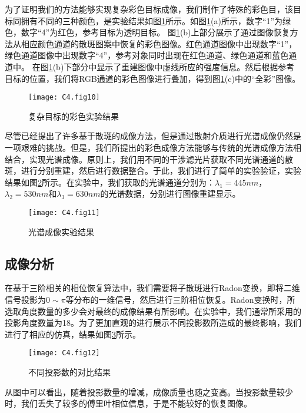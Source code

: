 为了证明我们的方法能够实现复杂彩色目标成像，我们制作了特殊的彩色目，该目标同拥有不同的三种颜色，是实验结果如图\ref{fig:4.10}所示。如图\ref{fig:4.10}(a)所示，数字“1”为绿色，数字“4”为红色，参考目标为透明目标。 图\ref{fig:4.10}(b)上部分展示了通过图像恢复方法从相应颜色通道的散斑图案中恢复的彩色图像。红色通道图像中出现数字“1”，绿色通道图像中出现数字“4”，参考对象同时出现在红色通道、绿色通道和蓝色通道中。 在图\ref{fig:4.10}(b)下部分中显示了重建图像中虚线所应的强度信息。然后根据参考目标的位置，我们将RGB通道的彩色图像进行叠加，得到图\ref{fig:4.10}(c)中的“全彩”图像。

\begin{figure}[htp]
	\centering
	\texttt{[image: C4.fig10]}
	\caption{复杂目标的彩色实验结果}
	\label{fig:4.10}
\end{figure}

尽管已经提出了许多基于散斑的成像方法，但是通过散射介质进行光谱成像仍然是一项艰难的挑战。但是，我们所提出的彩色成像方法能够与传统的光谱成像方法相结合，实现光谱成像。原则上，我们用不同的干涉滤光片获取不同光谱通道的散斑，进行分别重建，然后进行数据整合。于此，我们进行了简单的实验验证，实验结果如图\ref{fig:4.11}所示。在实验中，我们获取的光谱通道分别为：$\lambda_1 =445nm$，$\lambda_2  =530nm$和$\lambda_3  =630nm$的光谱数据，分别进行图像重建显示。

\begin{figure}[htp]
	\centering
	\texttt{[image: C4.fig11]}
	\caption{光谱成像实验结果}
	\label{fig:4.11}
\end{figure}

\subsection{成像分析}

在基于三阶相关的相位恢复算法中，我们需要将子散斑进行Radon变换，即将二维信号投影为$0\sim \pi$等分布的一维信号，然后进行三阶相位恢复。Radon变换时，所选取角度数量的多少会对最终的成像结果有所影响。在实验中，我们通常所采用的投影角度数量为18。为了更加直观的进行展示不同投影数所造成的最终影响，我们进行了相应的仿真，结果如图\ref{fig:4.12}所示。

\begin{figure}[htp]
	\centering
	\texttt{[image: C4.fig12]}
	\caption{不同投影数的对比结果}
	\label{fig:4.12}
\end{figure}

从图中可以看出，随着投影数量的增减，成像质量也随之变高。当投影数量较少时，我们丢失了较多的傅里叶相位信息，于是不能较好的恢复图像。

